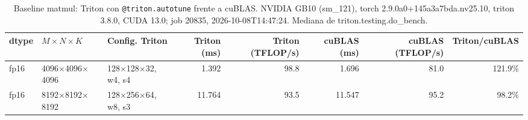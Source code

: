 \begin{table}[htbp]
  \centering\small
  \begin{tabular}{lllrrrrr}
    \toprule
    dtype & $M \times N \times K$ & Config. Triton & Triton (ms) & Triton (TFLOP/s) & cuBLAS (ms) & cuBLAS (TFLOP/s) & Triton/cuBLAS \\
    \midrule
    fp16 & 4096$\times$4096$\times$4096 & 128$\times$128$\times$32, w4, s4 & 1.392 & 98.8 & 1.696 & 81.0 & 121.9\% \\
    fp16 & 8192$\times$8192$\times$8192 & 128$\times$256$\times$64, w8, s3 & 11.764 & 93.5 & 11.547 & 95.2 & 98.2\% \\
    \bottomrule
  \end{tabular}
  \caption{Baseline matmul: Triton con \texttt{@triton.autotune} frente a cuBLAS. NVIDIA GB10 (sm\_121), torch 2.9.0a0+145a3a7bda.nv25.10, triton 3.8.0, CUDA 13.0; job 20835, 2026-10-08T14:47:24. Mediana de triton.testing.do\_bench.}
  \label{tab:hennessy-baseline-matmul}
\end{table}
